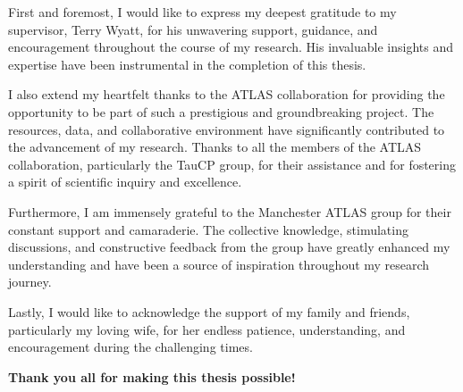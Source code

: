 
\begin{acknowledgements}      
    First and foremost, I would like to express my deepest gratitude 
    to my supervisor, Terry Wyatt, for his unwavering support, guidance, 
    and encouragement throughout the course of my research. His invaluable 
    insights and expertise have been instrumental in the completion of this thesis.

    I also extend my heartfelt thanks to the ATLAS collaboration for providing 
    the opportunity to be part of such a prestigious and groundbreaking project. 
    The resources, data, and collaborative environment have significantly contributed 
    to the advancement of my research. Thanks to all the members of the ATLAS 
    collaboration, particularly the TauCP group, for their assistance and for fostering a spirit of scientific inquiry and 
    excellence.
    
    Furthermore, I am immensely grateful to the Manchester ATLAS group for their constant 
    support and camaraderie. The collective knowledge, stimulating discussions, 
    and constructive feedback from the group have greatly enhanced my understanding 
    and have been a source of inspiration throughout my research journey.
    
    Lastly, I would like to acknowledge the support of my family and friends, 
    particularly my loving wife, for her endless patience, understanding, and 
    encouragement during the challenging times.
    
    \textbf{Thank you all for making this thesis possible!}
\end{acknowledgements}

